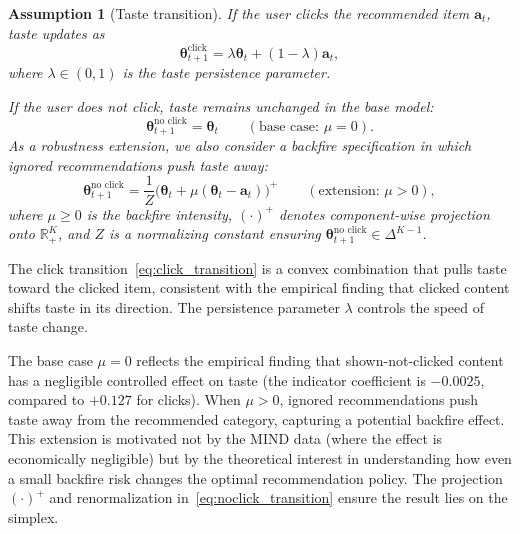 \documentclass[11pt]{article}
\newtheorem{assumption}{Assumption}
\newcommand{\R}{\mathbb{R}}
\begin{document}
\begin{assumption}[Taste transition]\label{as:transition}
If the user \emph{clicks} the recommended item $\mathbf{a}_t$, taste updates as
\begin{equation}\label{eq:click_transition}
\boldsymbol{\theta}_{t+1}^{\text{click}} = \lambda \boldsymbol{\theta}_t + (1 - \lambda) \mathbf{a}_t,
\end{equation}
where $\lambda \in (0,1)$ is the taste persistence parameter.

If the user does \emph{not click}, taste remains unchanged in the base model:
\begin{equation}\label{eq:noclick_base}
\boldsymbol{\theta}_{t+1}^{\text{no click}} = \boldsymbol{\theta}_t \qquad (\text{base case: } \mu = 0).
\end{equation}
As a robustness extension, we also consider a backfire specification in which ignored recommendations push taste away:
\begin{equation}\label{eq:noclick_transition}
\boldsymbol{\theta}_{t+1}^{\text{no click}} = \frac{1}{Z}\bigl(\boldsymbol{\theta}_t + \mu(\boldsymbol{\theta}_t - \mathbf{a}_t)\bigr)^{+} \qquad (\text{extension: } \mu > 0),
\end{equation}
where $\mu \ge 0$ is the backfire intensity, $(\cdot)^{+}$ denotes component-wise projection onto $\R_+^K$, and $Z$ is a normalizing constant ensuring $\boldsymbol{\theta}_{t+1}^{\text{no click}} \in \Delta^{K-1}$.
\end{assumption}

The click transition~\eqref{eq:click_transition} is a convex combination that pulls taste toward the clicked item, consistent with the empirical finding that clicked content shifts taste in its direction. The persistence parameter $\lambda$ controls the speed of taste change.

The base case $\mu = 0$ reflects the empirical finding that shown-not-clicked content has a negligible controlled effect on taste (the indicator coefficient is $-0.0025$, compared to $+0.127$ for clicks). When $\mu > 0$, ignored recommendations push taste away from the recommended category, capturing a potential backfire effect. This extension is motivated not by the MIND data (where the effect is economically negligible) but by the theoretical interest in understanding how even a small backfire risk changes the optimal recommendation policy. The projection $(\cdot)^{+}$ and renormalization in~\eqref{eq:noclick_transition} ensure the result lies on the simplex.
\end{document}
